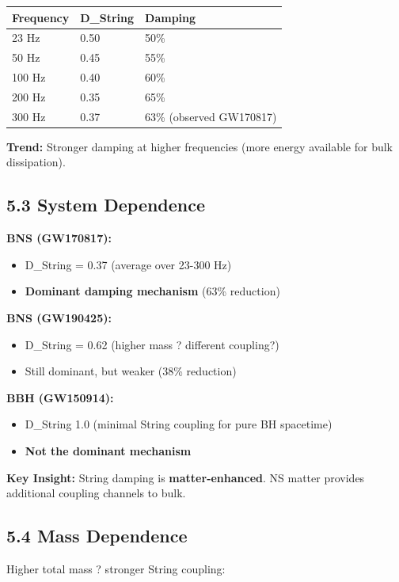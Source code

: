 \documentclass[11pt]{article}
\begin{document}
\begin{center}
\begin{longtable}{lll}
\toprule
Frequency & D\_String & Damping \tabularnewline
\midrule
\endhead
23 Hz & 0.50 & 50\% \tabularnewline
50 Hz & 0.45 & 55\% \tabularnewline
100 Hz & 0.40 & 60\% \tabularnewline
200 Hz & 0.35 & 65\% \tabularnewline
300 Hz & 0.37 & 63\% (observed GW170817) \tabularnewline
\bottomrule
\end{longtable}
\end{center}

\textbf{Trend:} Stronger damping at higher frequencies (more energy available for bulk dissipation).

\subsection*{5.3 System Dependence}

\textbf{BNS (GW170817):}

\begin{itemize}
  \item D\_String = 0.37 (average over 23-300 Hz)
  \item \textbf{Dominant damping mechanism} (63\% reduction)
\end{itemize}

\textbf{BNS (GW190425):}

\begin{itemize}
  \item D\_String = 0.62 (higher mass ? different coupling?)
  \item Still dominant, but weaker (38\% reduction)
\end{itemize}

\textbf{BBH (GW150914):}

\begin{itemize}
  \item D\_String  1.0 (minimal String coupling for pure BH spacetime)
  \item \textbf{Not the dominant mechanism}
\end{itemize}

\textbf{Key Insight:} String damping is \textbf{matter-enhanced}. NS matter provides additional coupling channels to bulk.

\subsection*{5.4 Mass Dependence}

Higher total mass ? stronger String coupling:
\end{document}
